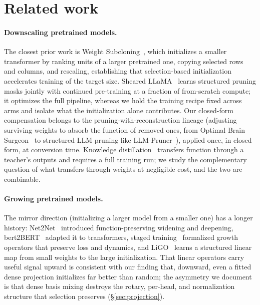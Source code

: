 \section{Related work}
\label{sec:related}

\paragraph{Downscaling pretrained models.}
The closest prior work is Weight Subcloning~\citep{samragh2023weight}, which
initializes a smaller transformer by ranking units of a larger pretrained one,
copying selected rows and columns, and rescaling, establishing that
selection-based initialization accelerates training of the target size. Sheared
LLaMA~\citep{xia2024sheared} learns structured pruning masks jointly with
continued pre-training at a fraction of from-scratch compute; it optimizes the
full pipeline, whereas we hold the training recipe fixed across arms and isolate
what the initialization alone contributes. Our closed-form compensation
belongs to the pruning-with-reconstruction lineage (adjusting surviving
weights to absorb the function of removed ones, from Optimal Brain
Surgeon~\citep{hassibi1993optimal} to structured LLM pruning like
LLM-Pruner~\citep{ma2023llmpruner}), applied once, in closed form, at conversion
time. Knowledge distillation~\citep{hinton2015distilling} transfers function
through a teacher's outputs and requires a full training run; we study the
complementary question of what transfers through weights at negligible
cost, and the two are combinable.

\paragraph{Growing pretrained models.}
The mirror direction (initializing a larger model from a smaller one)
has a longer history: Net2Net~\citep{chen2016net2net} introduced
function-preserving widening and deepening, bert2BERT~\citep{chen2022bert2bert}
adapted it to transformers, staged training~\citep{shen2022staged} formalized
growth operators that preserve loss and dynamics, and LiGO~\citep{wang2023ligo}
learns a structured linear map from small weights to the large initialization.
That linear operators carry useful signal upward is consistent with our finding
that, downward, even a fitted dense projection initializes far better than random;
the asymmetry we document is that dense basis mixing destroys the rotary,
per-head, and normalization structure that selection preserves
(\S\ref{sec:projection}).

